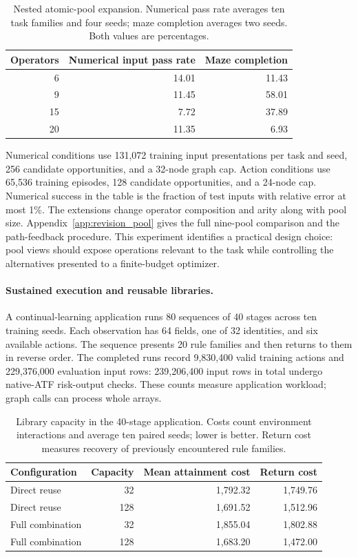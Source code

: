 \begin{table}[tb]
\centering\small
\caption{Nested atomic-pool expansion. Numerical pass rate averages ten task families and four seeds; maze completion averages two seeds. Both values are percentages.}
\label{tab:pool_expansion_main}
\begin{tabular}{rrr}
\toprule
Operators & Numerical input pass rate & Maze completion \\
\midrule
6 & 14.01 & 11.43 \\
9 & 11.45 & 58.01 \\
15 & 7.72 & 37.89 \\
20 & 11.35 & 6.93 \\
\bottomrule
\end{tabular}
\end{table}

Numerical conditions use 131,072 training input presentations per task and seed, 256 candidate opportunities, and a 32-node graph cap. Action conditions use 65,536 training episodes, 128 candidate opportunities, and a 24-node cap. Numerical success in the table is the fraction of test inputs with relative error at most 1\%. The extensions change operator composition and arity along with pool size. Appendix~\ref{app:revision_pool} gives the full nine-pool comparison and the path-feedback procedure. This experiment identifies a practical design choice: pool views should expose operations relevant to the task while controlling the alternatives presented to a finite-budget optimizer.

\paragraph{Sustained execution and reusable libraries.}
A continual-learning application runs 80 sequences of 40 stages across ten training seeds. Each observation has 64 fields, one of 32 identities, and six available actions. The sequence presents 20 rule families and then returns to them in reverse order. The completed runs record 9,830,400 valid training actions and 229,376,000 evaluation input rows: 239,206,400 input rows in total undergo native-ATF risk-output checks. These counts measure application workload; graph calls can process whole arrays.

\begin{table}[tb]
\centering\small
\caption{Library capacity in the 40-stage application. Costs count environment interactions and average ten paired seeds; lower is better. Return cost measures recovery of previously encountered rule families.}
\label{tab:library_main}
\begin{tabular}{lrrr}
\toprule
Configuration & Capacity & Mean attainment cost & Return cost \\
\midrule
Direct reuse & 32 & 1,792.32 & 1,749.76 \\
Direct reuse & 128 & 1,691.52 & 1,512.96 \\
Full combination & 32 & 1,855.04 & 1,802.88 \\
Full combination & 128 & 1,683.20 & 1,472.00 \\
\bottomrule
\end{tabular}
\end{table}

